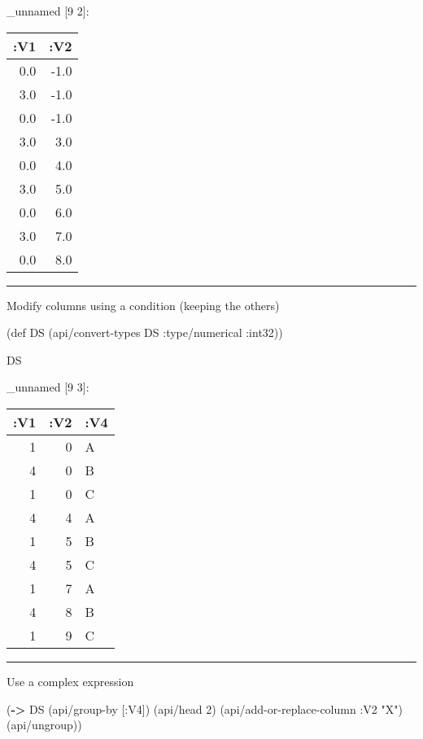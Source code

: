 \documentclass[]{article}
\newenvironment{Shaded}{\begin{snugshade}}{\end{snugshade}}
\newcommand{\KeywordTok}[1]{\textcolor[rgb]{0.13,0.29,0.53}{\textbf{#1}}}
\newcommand{\DecValTok}[1]{\textcolor[rgb]{0.00,0.00,0.81}{#1}}
\newcommand{\StringTok}[1]{\textcolor[rgb]{0.31,0.60,0.02}{#1}}
\newcommand{\FunctionTok}[1]{\textcolor[rgb]{0.00,0.00,0.00}{#1}}
\newcommand{\BuiltInTok}[1]{#1}
\newcommand{\AttributeTok}[1]{\textcolor[rgb]{0.77,0.63,0.00}{#1}}
\newcommand{\NormalTok}[1]{#1}
\begin{document}
\_unnamed {[}9 2{]}:

\begin{longtable}[]{@{}rr@{}}
\toprule
:V1 & :V2\tabularnewline
\midrule
\endhead
0.0 & -1.0\tabularnewline
3.0 & -1.0\tabularnewline
0.0 & -1.0\tabularnewline
3.0 & 3.0\tabularnewline
0.0 & 4.0\tabularnewline
3.0 & 5.0\tabularnewline
0.0 & 6.0\tabularnewline
3.0 & 7.0\tabularnewline
0.0 & 8.0\tabularnewline
\bottomrule
\end{longtable}

\begin{center}\rule{0.5\linewidth}{0.5pt}\end{center}

Modify columns using a condition (keeping the others)

\begin{Shaded}
\begin{Highlighting}[]
\NormalTok{(}\BuiltInTok{def}\FunctionTok{ DS }\NormalTok{(api/convert-types DS }\AttributeTok{:type/numerical} \AttributeTok{:int32}\NormalTok{))}
\end{Highlighting}
\end{Shaded}

\begin{Shaded}
\begin{Highlighting}[]
\NormalTok{DS}
\end{Highlighting}
\end{Shaded}

\_unnamed {[}9 3{]}:

\begin{longtable}[]{@{}rrl@{}}
\toprule
:V1 & :V2 & :V4\tabularnewline
\midrule
\endhead
1 & 0 & A\tabularnewline
4 & 0 & B\tabularnewline
1 & 0 & C\tabularnewline
4 & 4 & A\tabularnewline
1 & 5 & B\tabularnewline
4 & 5 & C\tabularnewline
1 & 7 & A\tabularnewline
4 & 8 & B\tabularnewline
1 & 9 & C\tabularnewline
\bottomrule
\end{longtable}

\begin{center}\rule{0.5\linewidth}{0.5pt}\end{center}

Use a complex expression

\begin{Shaded}
\begin{Highlighting}[]
\NormalTok{(}\KeywordTok{->}\NormalTok{ DS}
\NormalTok{    (api/group-by [}\AttributeTok{:V4}\NormalTok{])}
\NormalTok{    (api/head }\DecValTok{2}\NormalTok{)}
\NormalTok{    (api/add-or-replace-column }\AttributeTok{:V2} \StringTok{"X"}\NormalTok{)}
\NormalTok{    (api/ungroup))}
\end{Highlighting}
\end{Shaded}
\end{document}
